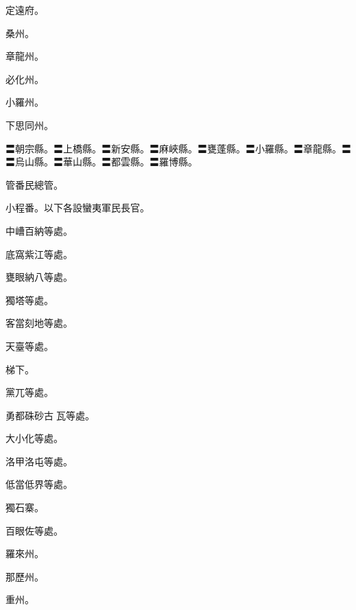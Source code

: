 \begin{pinyinscope}
 定遠府。



 桑州。



 章龍州。



 必化州。



 小羅州。



 下思同州。



 〓朝宗縣。〓上橋縣。〓新安縣。〓麻峽縣。〓甕蓬縣。〓小羅縣。〓章龍縣。〓〓烏山縣。〓華山縣。〓都雲縣。〓羅博縣。



 管番民總管。



 小程番。以下各設蠻夷軍民長官。



 中嶆百納等處。



 底窩紫江等處。



 甕眼納八等處。



 獨塔等處。



 客當刻地等處。



 天臺等處。



 梯下。



 黨兀等處。



 勇都硃砂古瓦等處。



 大小化等處。



 洛甲洛屯等處。



 低當低界等處。



 獨石寨。



 百眼佐等處。



 羅來州。



 那歷州。



 重州。




\end{pinyinscope}
